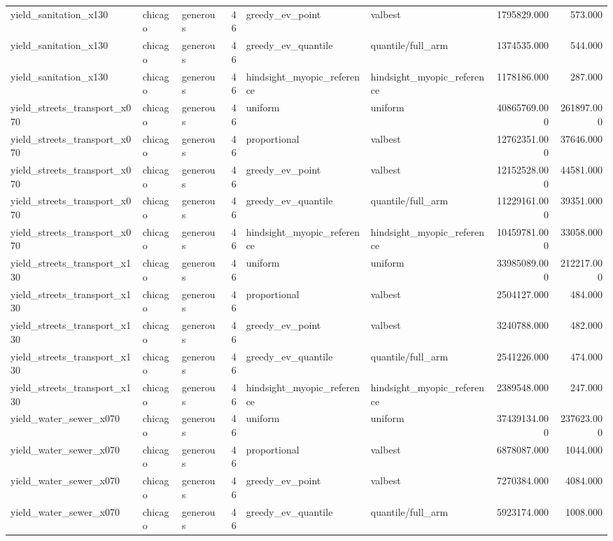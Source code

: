 \begin{tabular}{lllrllrr}
yield\_sanitation\_x130 & chicago & generous & 46 & greedy\_ev\_point & valbest & 1795829.000 & 573.000 \\
yield\_sanitation\_x130 & chicago & generous & 46 & greedy\_ev\_quantile & quantile/full\_arm & 1374535.000 & 544.000 \\
yield\_sanitation\_x130 & chicago & generous & 46 & hindsight\_myopic\_reference & hindsight\_myopic\_reference & 1178186.000 & 287.000 \\
yield\_streets\_transport\_x070 & chicago & generous & 46 & uniform & uniform & 40865769.000 & 261897.000 \\
yield\_streets\_transport\_x070 & chicago & generous & 46 & proportional & valbest & 12762351.000 & 37646.000 \\
yield\_streets\_transport\_x070 & chicago & generous & 46 & greedy\_ev\_point & valbest & 12152528.000 & 44581.000 \\
yield\_streets\_transport\_x070 & chicago & generous & 46 & greedy\_ev\_quantile & quantile/full\_arm & 11229161.000 & 39351.000 \\
yield\_streets\_transport\_x070 & chicago & generous & 46 & hindsight\_myopic\_reference & hindsight\_myopic\_reference & 10459781.000 & 33058.000 \\
yield\_streets\_transport\_x130 & chicago & generous & 46 & uniform & uniform & 33985089.000 & 212217.000 \\
yield\_streets\_transport\_x130 & chicago & generous & 46 & proportional & valbest & 2504127.000 & 484.000 \\
yield\_streets\_transport\_x130 & chicago & generous & 46 & greedy\_ev\_point & valbest & 3240788.000 & 482.000 \\
yield\_streets\_transport\_x130 & chicago & generous & 46 & greedy\_ev\_quantile & quantile/full\_arm & 2541226.000 & 474.000 \\
yield\_streets\_transport\_x130 & chicago & generous & 46 & hindsight\_myopic\_reference & hindsight\_myopic\_reference & 2389548.000 & 247.000 \\
yield\_water\_sewer\_x070 & chicago & generous & 46 & uniform & uniform & 37439134.000 & 237623.000 \\
yield\_water\_sewer\_x070 & chicago & generous & 46 & proportional & valbest & 6878087.000 & 1044.000 \\
yield\_water\_sewer\_x070 & chicago & generous & 46 & greedy\_ev\_point & valbest & 7270384.000 & 4084.000 \\
yield\_water\_sewer\_x070 & chicago & generous & 46 & greedy\_ev\_quantile & quantile/full\_arm & 5923174.000 & 1008.000 \\

\end{tabular}
